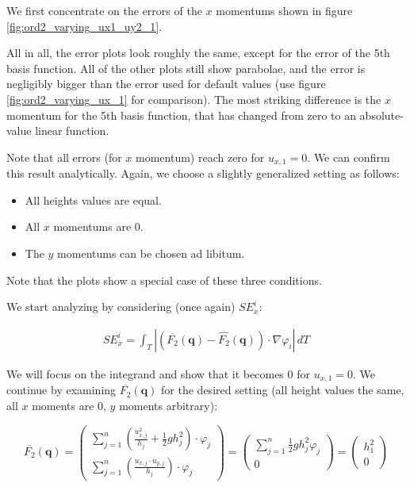 \documentclass{article}
\renewcommand{\phi}{\varphi}
\begin{document}
We first concentrate on the errors of the $x$ momentums shown in figure \ref{fig:ord2_varying_ux1_uy2_1}.



All in all, the error plots look roughly the same, except for the error of the 5th basis function. All of the other plots still show parabolae, and the error is negligibly bigger than the error used for default values (use figure \ref{fig:ord2_varying_ux_1} for comparison). The most striking difference is the $x$ momentum for the 5th basis function, that has changed from zero to an absolute-value linear function.

Note that all errors (for $x$ momentum) reach zero for $u_{x,1} = 0$. We can confirm this result analytically. Again, we choose a slightly generalized setting as follows:

\begin{itemize}
\item All heights values are equal.
\item All $x$ momentums are 0.
\item The $y$ momentums can be chosen ad libitum.
\end{itemize}

Note that the plots show a special case of these three conditions.

We start analyzing by considering (once again) $SE_x^i$:

\begin{align*}
  SE_x^i = \int_T \left| \left(\overline{F_2}(\mathbf{q}) - \widehat{F_2}(\mathbf{q})\right) \cdot \nabla \phi_i \right|\, dT
\end{align*}

We will focus on the integrand and show that it becomes 0 for $u_{x,1}=0$. We continue by examining $\overline{F_2}(\mathbf{q})$ for the desired setting (all height values the same, all $x$ moments are 0, $y$ moments arbitrary):

\begin{equation}
  \label{eq:1}
  \overline{F_2}(\mathbf{q}) =
  \begin{pmatrix}
    \sum_{j=1}^n \left( \frac{u_{x,j}^2}{h_j} + \frac{1}{2} g h_j^2 \right) \cdot \phi_j \\
    \sum_{j=1}^n \left( \frac{u_{x,j}\cdot u_{y,j}}{h_j} \right) \cdot \phi_j
  \end{pmatrix} =
  \begin{pmatrix}
    \sum_{j=1}^n \frac{1}{2} g h_j^2 \phi_j \\
    0
  \end{pmatrix} =
  \begin{pmatrix}
    h_1^2 \\ 0
  \end{pmatrix}
\end{equation}
\end{document}
